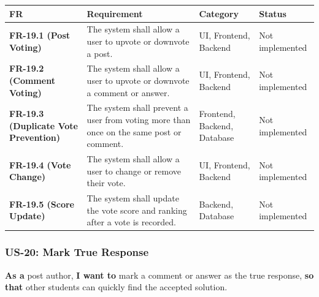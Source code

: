 \documentclass[12pt]{article}
\renewcommand{\baselinestretch}{1.5}
\begin{document}
\begingroup
\small
\renewcommand{\baselinestretch}{1.0}\selectfont
\renewcommand{\arraystretch}{1.15}
\setlength{\tabcolsep}{6pt}
\begin{longtable}{|>{\raggedright\arraybackslash}p{}|>{\raggedright\arraybackslash}p{}|>{\raggedright\arraybackslash}p{}|>{\raggedright\arraybackslash}p{}|}
\hline
\textbf{FR} & \textbf{Requirement} & \textbf{Category} & \textbf{Status} \\ \hline
\endhead
\textbf{FR-19.1 (Post Voting)} & The system shall allow a user to upvote or downvote a post. & UI, Frontend, Backend & Not implemented \\ \hline
\textbf{FR-19.2 (Comment Voting)} & The system shall allow a user to upvote or downvote a comment or answer. & UI, Frontend, Backend & Not implemented \\ \hline
\textbf{FR-19.3 (Duplicate Vote Prevention)} & The system shall prevent a user from voting more than once on the same post or comment. & Frontend, Backend, Database & Not implemented \\ \hline
\textbf{FR-19.4 (Vote Change)} & The system shall allow a user to change or remove their vote. & UI, Frontend, Backend & Not implemented \\ \hline
\textbf{FR-19.5 (Score Update)} & The system shall update the vote score and ranking after a vote is recorded. & Backend, Database & Not implemented \\ \hline
\end{longtable}
\endgroup
\par\medskip

\hypertarget{sec:us-20-mark-true-response}{}
\subsubsection*{US-20: Mark True Response}
\par\medskip

\textbf{As a} post author, \textbf{I want to} mark a comment or answer as the true response, \textbf{so that} other students can quickly find the accepted solution.
\par\medskip
\end{document}
